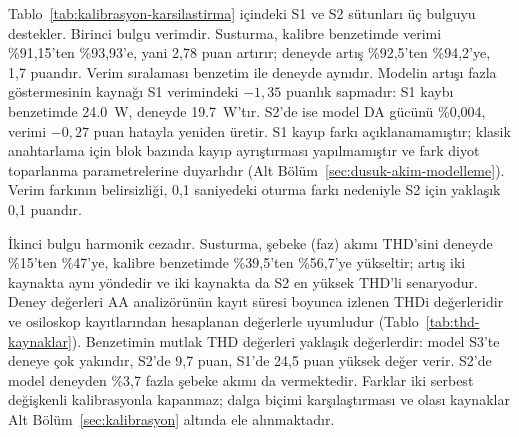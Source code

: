 Tablo~\ref{tab:kalibrasyon-karsilastirma} içindeki S1 ve S2 sütunları üç bulguyu destekler. Birinci bulgu verimdir. Susturma, kalibre benzetimde verimi \%91,15'ten \%93,93'e, yani 2,78 puan artırır; deneyde artış \%92,5'ten \%94,2'ye, 1,7 puandır. Verim sıralaması benzetim ile deneyde aynıdır. Modelin artışı fazla göstermesinin kaynağı S1 verimindeki $-1{,}35$ puanlık sapmadır: S1 kaybı benzetimde \SI{24.0}{\watt}, deneyde \SI{19.7}{\watt}'tır. S2'de ise model DA gücünü \%0,004, verimi $-0{,}27$ puan hatayla yeniden üretir. S1 kayıp farkı açıklanamamıştır; klasik anahtarlama için blok bazında kayıp ayrıştırması yapılmamıştır ve fark diyot toparlanma parametrelerine duyarlıdır (Alt Bölüm~\ref{sec:dusuk-akim-modelleme}). Verim farkının belirsizliği, 0,1 saniyedeki oturma farkı nedeniyle S2 için yaklaşık 0,1 puandır.

İkinci bulgu harmonik cezadır. Susturma, şebeke (faz) akımı THD'sini deneyde \%15'ten \%47'ye, kalibre benzetimde \%39,5'ten \%56,7'ye yükseltir; artış iki kaynakta aynı yöndedir ve iki kaynakta da S2 en yüksek THD'li senaryodur. Deney değerleri AA analizörünün kayıt süresi boyunca izlenen THDi değerleridir ve osiloskop kayıtlarından hesaplanan değerlerle uyumludur (Tablo~\ref{tab:thd-kaynaklar}). Benzetimin mutlak THD değerleri yaklaşık değerlerdir: model S3'te deneye çok yakındır, S2'de 9,7 puan, S1'de 24,5 puan yüksek değer verir. S2'de model deneyden \%3,7 fazla şebeke akımı da vermektedir. Farklar iki serbest değişkenli kalibrasyonla kapanmaz; dalga biçimi karşılaştırması ve olası kaynaklar Alt Bölüm~\ref{sec:kalibrasyon} altında ele alınmaktadır.


